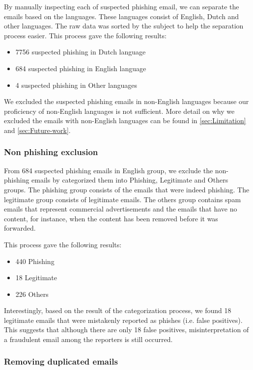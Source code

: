 By manually inspecting each of suspected phishing email, we can separate
the emails based on the languages. These languages consist of English,
Dutch and other languages. The raw data was sorted by the subject
to help the separation process easier. This process gave the following
results:
\begin{itemize}
\item 7756 suspected phishing in Dutch language
\item 684 suspected phishing in English language
\item 4 suspected phishing in Other languages
\end{itemize}
We excluded the suspected phishing emails in non-English languages
because our proficiency of non-English languages is not sufficient.
More detail on why we excluded the emails with non-English languages
can be found in \autoref{sec:Limitation} and \autoref{sec:Future-work}. 


\subsubsection{Non phishing exclusion}

From 684 suspected phishing emails in English group, we exclude the
non-phishing emails by categorized them into Phishing, Legitimate
and Others groups. The phishing group consists of the emails that
were indeed phishing. The legitimate group consists of legitimate
emails. The others group contains spam emails that represent commercial
advertisements and the emails that have no content, for instance,
when the content has been removed before it was forwarded. 

This process gave the following results:
\begin{itemize}
\item 440 Phishing
\item 18 Legitimate
\item 226 Others 
\end{itemize}
Interestingly, based on the result of the categorization process,
we found 18 legitimate emails that were mistakenly reported as phishes
(i.e. false positives). This suggests that although there are only
18 false positives, misinterpretation of a fraudulent email among
the reporters is still occurred.


\subsubsection{Removing duplicated emails}

